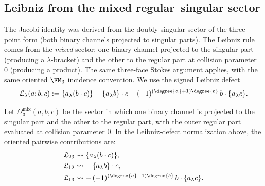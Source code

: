 \subsection{Leibniz from the mixed regular--singular sector}

The Jacobi identity was derived from the doubly singular sector of
the three-point form (both binary channels projected to singular
parts). The Leibniz rule comes from the \emph{mixed} sector: one
binary channel projected to the singular part (producing a
$\lambda$-bracket) and the other to the regular part at collision
parameter~$0$ (producing a product). The same three-face Stokes
argument applies, with the same oriented \(\FM_3\) incidence
convention.  We use the signed Leibniz defect
\[
\mathcal L_\lambda(a;b,c)
:=
\{a_\lambda(b\cdot c)\}
-
\{a_\lambda b\}\cdot c
-
(-1)^{(\degree{a}+1)\degree{b}}\,
b\cdot\{a_\lambda c\}.
\]

\begin{lemma}
\label{lem:three-face-leibniz}
Let $\Omega_3^{\mathrm{mix}}(a,b,c)$ be the sector in which one binary channel is
projected to the singular part and the other to the regular part, with the outer regular
part evaluated at collision parameter $0$. In the Leibniz-defect
normalization above, the oriented pairwise contributions are:
\begin{align}
\label{eq:res23-leibniz}
\mathfrak L_{23} &\leadsto \{a_\lambda (b\cdot c)\},\\
\label{eq:res12-leibniz}
\mathfrak L_{12} &\leadsto -\,\{a_\lambda b\}\cdot c,\\
\label{eq:res13-leibniz}
\mathfrak L_{13} &\leadsto
-\,(-1)^{(\degree{a}+1)\degree{b}}\,
b\cdot\{a_\lambda c\}.
\end{align}
\end{lemma}

